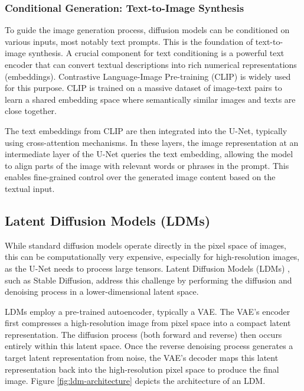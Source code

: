 \subsubsection{Conditional Generation: Text-to-Image Synthesis}
To guide the image generation process, diffusion models can be conditioned on various inputs, most notably text prompts. This is the foundation of text-to-image synthesis.
A crucial component for text conditioning is a powerful text encoder that can convert textual descriptions into rich numerical representations (embeddings). Contrastive Language-Image Pre-training (CLIP) \cite{clip} is widely used for this purpose. CLIP is trained on a massive dataset of image-text pairs to learn a shared embedding space where semantically similar images and texts are close together.

The text embeddings from CLIP are then integrated into the U-Net, typically using cross-attention mechanisms. In these layers, the image representation at an intermediate layer of the U-Net queries the text embedding, allowing the model to align parts of the image with relevant words or phrases in the prompt. This enables fine-grained control over the generated image content based on the textual input.

\subsection{Latent Diffusion Models (LDMs)}\label{ssec:ldm}
While standard diffusion models operate directly in the pixel space of images, this can be computationally very expensive, especially for high-resolution images, as the U-Net needs to process large tensors. Latent Diffusion Models (LDMs) \cite{stablediffusion}, such as Stable Diffusion, address this challenge by performing the diffusion and denoising process in a lower-dimensional latent space.

LDMs employ a pre-trained autoencoder, typically a VAE. The VAE's encoder first compresses a high-resolution image from pixel space into a compact latent representation. The diffusion process (both forward and reverse) then occurs entirely within this latent space. Once the reverse denoising process generates a target latent representation from noise, the VAE's decoder maps this latent representation back into the high-resolution pixel space to produce the final image. Figure \ref{fig:ldm-architecture} depicts the architecture of an LDM.

